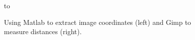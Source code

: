 {{\begin{figure}
    \noindent
    \hbox to 
    \caption{Using Matlab to extract image coordinates (left) and Gimp to
             measure distances (right).}
        \label{fig:plotgraphics3d}
\end{figure}


}}
